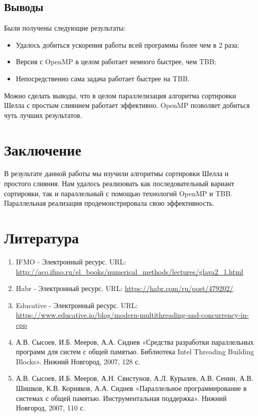 \documentclass[]{article}
\theoremstyle{remark}
\theoremstyle{definition}
\begin{document}
\subsection{Выводы}

\par Были получены следующие результаты:

\begin{itemize}
    \item Удалось добиться ускорения работы всей программы более чем в 2 раза;
    \item Версия с OpenMP в целом работает немного быстрее, чем TBB;
    \item Непосредственно сама задача работает быстрее на TBB.
\end{itemize}

\par Можно сделать выводы, что в целом параллелизация алгоритма сортировки Шелла с простым слиянием работает эффективно. OpenMP позволяет добиться чуть лучших результатов.

\newpage

\section{Заключение}

\par В результате данной работы мы изучили алгоритмы сортировки Шелла и простого слияния. Нам удалось реализовать как последовательный вариант сортировки, так и параллельный с помощью технологий OpenMP и TBB. Параллельная реализация продемонстрировала свою эффективность. 

\newpage

\section{Литература}
\begin{enumerate}
\item IFMO - Электронный ресурс. URL: \newline \url{http://aco.ifmo.ru/el_books/numerical_methods/lectures/glava2_1.html}
\item Habr - Электронный ресурс. URL: \newline \url{https://habr.com/ru/post/479202/}
\item Educative - Электронный ресурс. URL: \newline \url{https://www.educative.io/blog/modern-multithreading-and-concurrency-in-cpp}
\item А.В. Сысоев, И.Б. Мееров, А.А. Сиднев «Средства разработки параллельных программ для систем с общей памятью. Библиотека Intel Threading Building Blocks». Нижний Новгород, 2007, 128 с. 
\item А.В. Сысоев, И.Б. Мееров, А.Н. Свистунов, А.Л. Курылев, А.В. Сенин, А.В. Шишков, К.В. Корняков, А.А. Сиднев «Параллельное программирование в системах с общей
памятью. Инструментальная поддержка». Нижний Новгород, 2007, 110 с. 
\end{enumerate}
\end{document}
